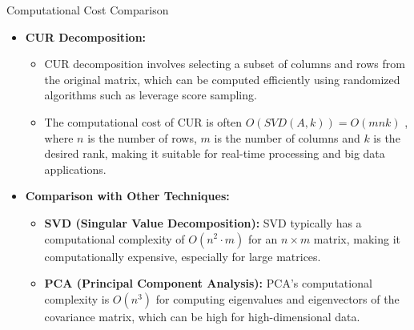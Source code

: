 \documentclass[pdf]{beamer}
\begin{document}
\begin{frame}{Computational Cost Comparison}
            \begin{itemize}
                \item \textbf{CUR Decomposition:} 
                    \begin{itemize}
                        \item CUR decomposition involves selecting a subset of columns and rows from the original matrix, which can be computed efficiently using randomized algorithms such as leverage score sampling.
                        \item The computational cost of CUR is often \(O(SVD(A,k)) = O(mnk)\) \cite{MahoneyDrineas2009}, where \(n\) is the number of rows, \(m\) is the number of columns and \(k\) is the desired rank, making it suitable for real-time processing and big data applications.
                    \end{itemize}
                \item \textbf{Comparison with Other Techniques:}
                    \begin{itemize}
                        \item \textbf{SVD (Singular Value Decomposition):} SVD typically has a computational complexity of \(O(n^2 \cdot m)\) for an \(n \times m\) matrix, making it computationally expensive, especially for large matrices.
                        \item \textbf{PCA (Principal Component Analysis):} PCA's computational complexity is \(O(n^3)\) for computing eigenvalues and eigenvectors of the covariance matrix, which can be high for high-dimensional data.
                    \end{itemize}
            \end{itemize}
\end{frame}
\end{document}
